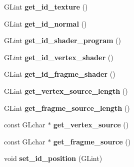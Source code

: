 \begin{DoxyCompactItemize}
\item 
\hypertarget{classShader_a5b7e6535c346214a2ba3ec99292dbdd4}{G\+Lint {\bfseries get\+\_\+id\+\_\+texture} ()}\label{classShader_a5b7e6535c346214a2ba3ec99292dbdd4}

\item 
\hypertarget{classShader_a1cdb38d8baaf61386daf821571ec14fb}{G\+Lint {\bfseries get\+\_\+id\+\_\+normal} ()}\label{classShader_a1cdb38d8baaf61386daf821571ec14fb}

\item 
\hypertarget{classShader_ad6a6e43bd572807fc9a953a6b2a3ef9d}{G\+Lint {\bfseries get\+\_\+id\+\_\+shader\+\_\+program} ()}\label{classShader_ad6a6e43bd572807fc9a953a6b2a3ef9d}

\item 
\hypertarget{classShader_a41ebfcbdd94a879d792061f10accdd89}{G\+Lint {\bfseries get\+\_\+id\+\_\+vertex\+\_\+shader} ()}\label{classShader_a41ebfcbdd94a879d792061f10accdd89}

\item 
\hypertarget{classShader_a734d169d6c629fc8736709c4968d40b2}{G\+Lint {\bfseries get\+\_\+id\+\_\+fragme\+\_\+shader} ()}\label{classShader_a734d169d6c629fc8736709c4968d40b2}

\item 
\hypertarget{classShader_a6cf65e9e7d4c32f291f8459147892c74}{G\+Lint {\bfseries get\+\_\+vertex\+\_\+source\+\_\+length} ()}\label{classShader_a6cf65e9e7d4c32f291f8459147892c74}

\item 
\hypertarget{classShader_a777e9d01476d05d903046d56b101a6d7}{G\+Lint {\bfseries get\+\_\+fragme\+\_\+source\+\_\+length} ()}\label{classShader_a777e9d01476d05d903046d56b101a6d7}

\item 
\hypertarget{classShader_a542ce38b62b30f0dee196a26d592f832}{const G\+Lchar $\ast$ {\bfseries get\+\_\+vertex\+\_\+source} ()}\label{classShader_a542ce38b62b30f0dee196a26d592f832}

\item 
\hypertarget{classShader_a5a428e47bd98890bf28971533130f7fd}{const G\+Lchar $\ast$ {\bfseries get\+\_\+fragme\+\_\+source} ()}\label{classShader_a5a428e47bd98890bf28971533130f7fd}

\item 
\hypertarget{classShader_ac8585f98b706b27e44ea126b912c2ef7}{void {\bfseries set\+\_\+id\+\_\+position} (G\+Lint)}\label{classShader_ac8585f98b706b27e44ea126b912c2ef7}


\end{DoxyCompactItemize}

